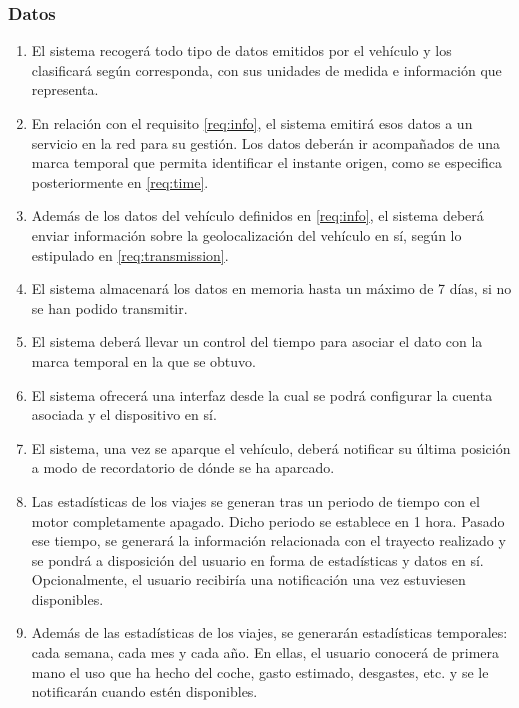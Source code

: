 \subsubsection{Datos}
\begin{enumerate}[resume, label=\textbf{\texttt{RF-\arabic*}}]
  \item\label{req:info} El sistema recogerá todo tipo de datos emitidos por el
        vehículo y los clasificará según corresponda, con sus unidades de medida
        e información que representa.
  \item\label{req:transmission} En relación con el requisito \ref{req:info},
        el sistema emitirá esos datos a un servicio en la red para su gestión. Los
        datos deberán ir acompañados de una marca temporal que permita identificar
        el instante origen, como se especifica posteriormente en \ref{req:time}.
  \item\label{req:gps-data} Además de los datos del vehículo definidos en \ref{req:info},
        el sistema deberá enviar información sobre la geolocalización del vehículo
        en sí, según lo estipulado en \ref{req:transmission}.
  \item\label{req:storage} El sistema almacenará los datos en memoria hasta un máximo
        de 7 días, si no se han podido transmitir.
  \item\label{req:time} El sistema deberá llevar un control del tiempo para asociar
        el dato con la marca temporal en la que se obtuvo.
  \item\label{req:conf} El sistema ofrecerá una interfaz desde la cual se podrá
        configurar la cuenta asociada y el dispositivo en sí.
  \item\label{req:parking} El sistema, una vez se aparque el vehículo, deberá
        notificar su última posición a modo de recordatorio de dónde se ha aparcado.
  \item\label{req:stats} Las estadísticas de los viajes se generan tras un periodo
        de tiempo con el motor completamente apagado. Dicho periodo se establece
        en 1 hora. Pasado ese tiempo, se generará la información relacionada con el
        trayecto realizado y se pondrá a disposición del usuario en forma de estadísticas
        y datos en sí. Opcionalmente, el usuario recibiría una notificación una vez
        estuviesen disponibles.
  \item\label{req:periodic-stats} Además de las estadísticas de los viajes,
        se generarán estadísticas temporales: cada semana, cada mes y cada año.
        En ellas, el usuario conocerá de primera mano el uso que ha hecho del coche,
        gasto estimado, desgastes, etc. y se le notificarán cuando estén disponibles.
\end{enumerate}

